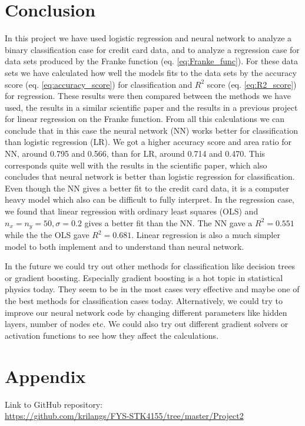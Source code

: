 \documentclass[12pt,a4paper,english]{article}
\begin{document}
\section{Conclusion}
In this project we have used logistic regression and neural network to analyze a binary classification case for credit card data, and to analyze a regression case for data sets produced by the Franke function (eq. \ref{eq:Franke_func}). For these data sets we have calculated how well the models fits to the data sets by the accuracy score (eq. \ref{eq:accuracy_score}) for classification and $R^2$ score (eq. \ref{eq:R2_score}) for regression. These results were then compared between the methods we have used, the results in a similar scientific paper \cite{origarticle} and the results in a previous project \cite{proj1} for linear regression on the Franke function. From all this calculations we can conclude that in this case the neural network (NN) works better for classification than logistic regression (LR). We got a higher accuracy score and area ratio for NN, around 0.795 and 0.566, than for LR, around 0.714 and 0.470. This corresponds quite well with the results in the scientific paper, which also concludes that neural network is better than logistic regression for classification. Even though the NN gives a better fit to the credit card data, it is a computer heavy model which also can be difficult to fully interpret. In the regression case, we found that linear regression with ordinary least squares (OLS) and $n_x=n_y=50, \sigma=0.2$ gives a better fit than the NN. The NN gave a $R^2=0.551$ while the the OLS gave $R^2=0.681$. Linear regression is also a much simpler model to both implement and to understand than neural network.

In the future we could try out other methods for classification like decision trees or gradient boosting. Especially gradient boosting is a hot topic in statistical physics today. They seem to be in the most cases very effective and maybe one of the best methods for classification cases today. Alternatively, we could try to improve our neural network code by changing different parameters like hidden layers, number of nodes etc. We could also try out different gradient solvers or activation functions to see how they affect the calculations.

\appendix
\section{Appendix}
\label{sect:Appendix}
Link to GitHub repository:\\
\url{https://github.com/krilangs/FYS-STK4155/tree/master/Project2}



\end{document}
